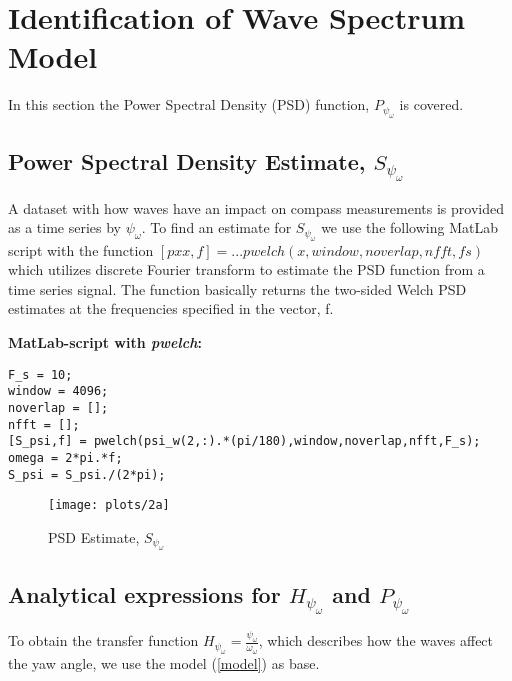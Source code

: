 \newpage
\section{Identification of Wave Spectrum Model}

In this section the Power Spectral Density (PSD) function, ${P_{{\psi _\omega }}}$ is covered.

\subsection{Power Spectral Density Estimate, $S_{\psi_{\omega}}$}

A dataset with how waves have an impact on compass measurements is provided as a time series by ${\psi _\omega }$. To find an estimate for ${S_{{\psi _\omega }}}$ we use the following MatLab script with the function $[pxx, f] = ...pwelch(x, window, noverlap, nfft, fs)$ which utilizes discrete Fourier transform to estimate the PSD function from a time series signal. The function basically returns the two-sided Welch PSD estimates at the frequencies specified in the vector, f. 

\textbf{MatLab-script with \textit{pwelch}:}
\begin{lstlisting}
F_s = 10;
window = 4096;
noverlap = [];
nfft = [];  
[S_psi,f] = pwelch(psi_w(2,:).*(pi/180),window,noverlap,nfft,F_s);
omega = 2*pi.*f;
S_psi = S_psi./(2*pi);  
\end{lstlisting}

\begin{figure}[!htb]
    \caption{PSD Estimate, $S_{\psi_{\omega}}$}
    \centering
    \centerline{\texttt{[image: plots/2a]}}
    \label{plot:2a}
\end{figure}

\subsection{Analytical expressions for ${H_{{\psi _\omega }}}$ and ${P_{{\psi _\omega }}}$}

To obtain the transfer function ${H_{{\psi _\omega }}} = \frac{{{\psi _\omega }}}{{{\omega _\omega }}}$, which describes how the waves affect the yaw angle, we use the model (\ref{model}) as base.

